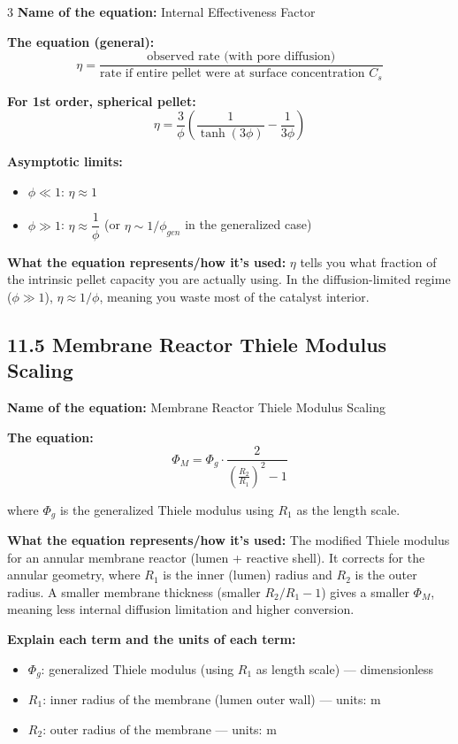\documentclass[8pt]{extarticle}
\begin{document}
\begin{multicols*}{3}
\textbf{Name of the equation:} Internal Effectiveness Factor

\textbf{The equation (general):}
\[
\eta
=
\frac{\text{observed rate (with pore diffusion)}}{\text{rate if entire pellet were at surface concentration }C_s}
\]

\textbf{For 1st order, spherical pellet:}
\[
\eta
=
\frac{3}{\phi}
\left(
\frac{1}{\tanh(3\phi)}-\frac{1}{3\phi}
\right)
\]

\textbf{Asymptotic limits:}
\begin{itemize}
\item \(\phi\ll 1\): \(\eta\approx 1\)
\item \(\phi\gg 1\): \(\eta\approx \dfrac{1}{\phi}\) (or \(\eta\sim 1/\phi_{gen}\) in the generalized case)
\end{itemize}

\textbf{What the equation represents/how it's used:} \(\eta\) tells you what fraction of the intrinsic pellet capacity you are actually using. In the diffusion-limited regime (\(\phi\gg 1\)), \(\eta\approx 1/\phi\), meaning you waste most of the catalyst interior.

\subsection*{11.5 Membrane Reactor Thiele Modulus Scaling}

\textbf{Name of the equation:} Membrane Reactor Thiele Modulus Scaling

\textbf{The equation:}
\[
\Phi_M
=
\Phi_g\cdot
\frac{2}{\left(\frac{R_2}{R_1}\right)^2-1}
\]

where \(\Phi_g\) is the generalized Thiele modulus using \(R_1\) as the length scale.

\textbf{What the equation represents/how it's used:} The modified Thiele modulus for an annular membrane reactor (lumen + reactive shell). It corrects for the annular geometry, where \(R_1\) is the inner (lumen) radius and \(R_2\) is the outer radius. A smaller membrane thickness (smaller \(R_2/R_1-1\)) gives a smaller \(\Phi_M\), meaning less internal diffusion limitation and higher conversion.

\textbf{Explain each term and the units of each term:}
\begin{itemize}
\item \(\Phi_g\): generalized Thiele modulus (using \(R_1\) as length scale) --- dimensionless
\item \(R_1\): inner radius of the membrane (lumen outer wall) --- units: \(\mathrm{m}\)
\item \(R_2\): outer radius of the membrane --- units: \(\mathrm{m}\)
\end{itemize}


\end{multicols*}
\end{document}
